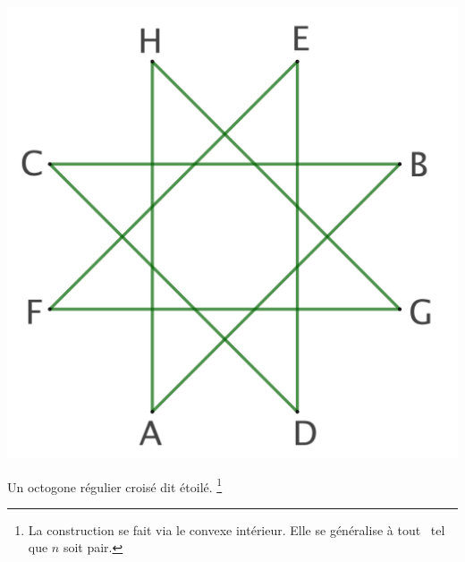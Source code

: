 \begin{remark}
\begin{multicols}{2}
	    \includegraphics[scale=.3]{content/polygon/def/8-iso-non-conv.png}
    
        \smallskip
        Un octogone régulier croisé dit étoilé.%
	    \footnote{
	        La construction se fait via le  convexe intérieur. Elle se généralise à tout \nreg\ tel que $n$ soit pair.
	    }

    \end{multicols}
\end{remark}
